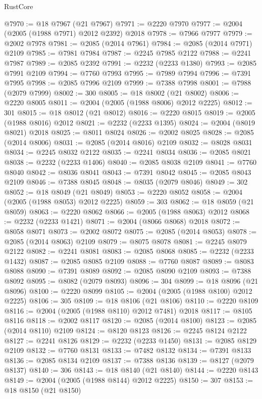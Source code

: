 \begin{lexlean}{RustCore}
\begin{coremodule}
@7970 := @18 @7967 (@21 @7967)
@7971 := @2220 @7970
@7977 := @2004 (@2005 (@1988 @7971) @2012 @2392) @2018
@7978 := @7966 @7977
@7979 := @2002 @7978
@7981 := @2085 (@2014 @7961)
@7984 := @2085 (@2014 @7971) @2109
@7985 := @7981 @7984
@7987 := @2245 @7985 @2122
@7988 := @2241 @7987
@7989 := @2085 @2392
@7991 := @2232 (@2233 @1380)
@7993 := @2085 @7991 @2109
@7994 := @7760 @7993
@7995 := @7989 @7994
@7996 := @7391 @7995
@7998 := @2085 @7996 @2109
@7999 := @7388 @7998
@8001 := @7988 (@2079 @7999)
@8002 := 300
@8005 := @18 @8002 (@21 @8002)
@8006 := @2220 @8005
@8011 := @2004 (@2005 (@1988 @8006) @2012 @2225)
@8012 := 301
@8015 := @18 @8012 (@21 @8012)
@8016 := @2220 @8015
@8019 := @2005 (@1988 @8016) @2012
@8021 := @2232 (@2233 @1395)
@8024 := @2004 (@8019 @8021) @2018
@8025 := @8011 @8024
@8026 := @2002 @8025
@8028 := @2085 (@2014 @8006)
@8031 := @2085 (@2014 @8016) @2109
@8032 := @8028 @8031
@8034 := @2245 @8032 @2122
@8035 := @2241 @8034
@8036 := @2085 @8021
@8038 := @2232 (@2233 @1406)
@8040 := @2085 @8038 @2109
@8041 := @7760 @8040
@8042 := @8036 @8041
@8043 := @7391 @8042
@8045 := @2085 @8043 @2109
@8046 := @7388 @8045
@8048 := @8035 (@2079 @8046)
@8049 := 302
@8052 := @18 @8049 (@21 @8049)
@8053 := @2220 @8052
@8058 := @2004 (@2005 (@1988 @8053) @2012 @2225)
@8059 := 303
@8062 := @18 @8059 (@21 @8059)
@8063 := @2220 @8062
@8066 := @2005 (@1988 @8063) @2012
@8068 := @2232 (@2233 @1421)
@8071 := @2004 (@8066 @8068) @2018
@8072 := @8058 @8071
@8073 := @2002 @8072
@8075 := @2085 (@2014 @8053)
@8078 := @2085 (@2014 @8063) @2109
@8079 := @8075 @8078
@8081 := @2245 @8079 @2122
@8082 := @2241 @8081
@8083 := @2085 @8068
@8085 := @2232 (@2233 @1432)
@8087 := @2085 @8085 @2109
@8088 := @7760 @8087
@8089 := @8083 @8088
@8090 := @7391 @8089
@8092 := @2085 @8090 @2109
@8093 := @7388 @8092
@8095 := @8082 (@2079 @8093)
@8096 := 304
@8099 := @18 @8096 (@21 @8096)
@8100 := @2220 @8099
@8105 := @2004 (@2005 (@1988 @8100) @2012 @2225)
@8106 := 305
@8109 := @18 @8106 (@21 @8106)
@8110 := @2220 @8109
@8116 := @2004 (@2005 (@1988 @8110) @2012 @7481) @2018
@8117 := @8105 @8116
@8118 := @2002 @8117
@8120 := @2085 (@2014 @8100)
@8123 := @2085 (@2014 @8110) @2109
@8124 := @8120 @8123
@8126 := @2245 @8124 @2122
@8127 := @2241 @8126
@8129 := @2232 (@2233 @1450)
@8131 := @2085 @8129 @2109
@8132 := @7760 @8131
@8133 := @7482 @8132
@8134 := @7391 @8133
@8136 := @2085 @8134 @2109
@8137 := @7388 @8136
@8139 := @8127 (@2079 @8137)
@8140 := 306
@8143 := @18 @8140 (@21 @8140)
@8144 := @2220 @8143
@8149 := @2004 (@2005 (@1988 @8144) @2012 @2225)
@8150 := 307
@8153 := @18 @8150 (@21 @8150)

\end{coremodule}
\end{lexlean}
